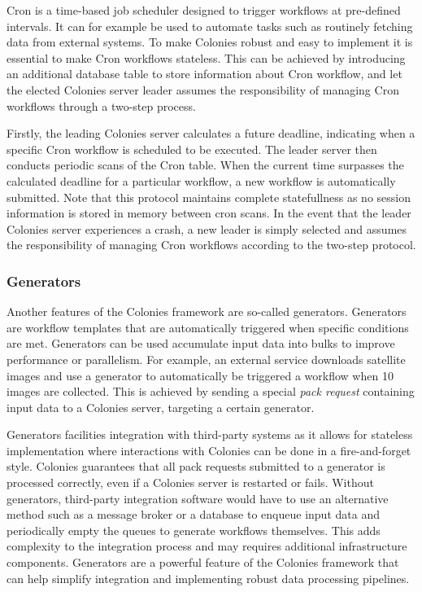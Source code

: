 \documentclass{article}
\begin{document}
Cron is a time-based job scheduler designed to trigger workflows at pre-defined intervals. It can for example be used to automate tasks such as routinely fetching data from external systems. To make Colonies robust and easy to implement it is essential to make Cron workflows stateless. This can be achieved by introducing an additional database table to store information about Cron workflow, and let the elected Colonies server leader assumes the responsibility of managing Cron workflows through a two-step process. 

Firstly, the leading Colonies server calculates a future deadline, indicating when a specific Cron workflow is scheduled to be executed. The leader server then conducts periodic scans of the Cron table. When the current time surpasses the calculated deadline for a particular workflow, a new workflow is automatically submitted. Note that this protocol maintains complete statefullness as no session information is stored in memory between cron scans. In the event that the leader Colonies server experiences a crash, a new leader is simply selected and assumes the responsibility of managing Cron workflows according to the two-step protocol.

\subsubsection{Generators}
Another features of the Colonies framework are so-called generators. Generators are workflow templates that are automatically triggered when specific conditions are met. Generators can be used accumulate input data into bulks to improve performance or parallelism. For example, an external service downloads satellite images and use a generator to automatically be triggered a workflow when 10 images are collected. This is achieved by sending a special \emph{pack request} containing input data to a Colonies server, targeting a certain generator. 

Generators facilities integration with third-party systems as it allows for stateless implementation where interactions with Colonies can be done in a fire-and-forget style. Colonies guarantees that all pack requests submitted to a generator is processed correctly, even if a Colonies server is restarted or fails. Without generators, third-party integration software would have to use an alternative method such as a message broker or a database to enqueue input data and periodically empty the queues to generate workflows themselves. This adds complexity to the integration process and may requires additional infrastructure components. Generators are a powerful feature of the Colonies framework that can help simplify integration and implementing robust data processing pipelines.
\end{document}
